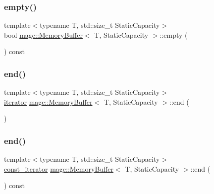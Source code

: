 \mbox{\label{classmage_1_1_memory_buffer_a57c8851d871387a250fdcb201019b796}} 
\subsubsection{\texorpdfstring{empty()}{empty()}}
{\footnotesize\ttfamily template$<$typename T, std\+::size\+\_\+t Static\+Capacity$>$ \\
bool \mbox{\hyperlink{classmage_1_1_memory_buffer}{mage\+::\+Memory\+Buffer}}$<$ T, Static\+Capacity $>$\+::empty (\begin{DoxyParamCaption}{ }\end{DoxyParamCaption}) const\hspace{0.3cm}{\ttfamily [noexcept]}}

\mbox{\label{classmage_1_1_memory_buffer_a585d8f25ccd06d70981b487e1cdb4606}} 
\subsubsection{\texorpdfstring{end()}{end()}\hspace{0.1cm}{\footnotesize\ttfamily [1/2]}}
{\footnotesize\ttfamily template$<$typename T, std\+::size\+\_\+t Static\+Capacity$>$ \\
\mbox{\hyperlink{classmage_1_1_memory_buffer_af487a5f5f07f8ba65e3a5d3a26d32b6c}{iterator}} \mbox{\hyperlink{classmage_1_1_memory_buffer}{mage\+::\+Memory\+Buffer}}$<$ T, Static\+Capacity $>$\+::end (\begin{DoxyParamCaption}{ }\end{DoxyParamCaption})\hspace{0.3cm}{\ttfamily [noexcept]}}

\mbox{\label{classmage_1_1_memory_buffer_a1c1d46af99b67f4512538b1217e0c8eb}} 
\subsubsection{\texorpdfstring{end()}{end()}\hspace{0.1cm}{\footnotesize\ttfamily [2/2]}}
{\footnotesize\ttfamily template$<$typename T, std\+::size\+\_\+t Static\+Capacity$>$ \\
\mbox{\hyperlink{classmage_1_1_memory_buffer_a3cc14c15660c36d35195e1836db33ee7}{const\+\_\+iterator}} \mbox{\hyperlink{classmage_1_1_memory_buffer}{mage\+::\+Memory\+Buffer}}$<$ T, Static\+Capacity $>$\+::end (\begin{DoxyParamCaption}{ }\end{DoxyParamCaption}) const\hspace{0.3cm}{\ttfamily [noexcept]}}

